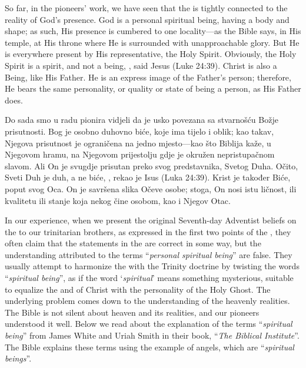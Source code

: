So far, in the pioneers’ work, we have seen that the  is tightly connected to the reality of God’s presence. God is a personal spiritual being, having a body and shape; as such, His presence is cumbered to one locality—as the Bible says, in His temple, at His throne where He is surrounded with unapproachable glory. But He is everywhere present by His representative, the Holy Spirit. Obviously, the Holy Spirit is a spirit, and not a being, , said Jesus (Luke 24:39). Christ is also a Being, like His Father. He is an express image of the Father’s person; therefore, He bears the same personality, or quality or state of being a person, as His Father does.


Do sada smo u radu pionira vidjeli da je  usko povezana sa stvarnošću Božje prisutnosti. Bog je osobno duhovno biće, koje ima tijelo i oblik; kao takav, Njegova prisutnost je ograničena na jedno mjesto—kao što Biblija kaže, u Njegovom hramu, na Njegovom prijestolju gdje je okružen nepristupačnom slavom. Ali On je svugdje prisutan preko svog predstavnika, Svetog Duha. Očito, Sveti Duh je duh, a ne biće, , rekao je Isus (Luka 24:39). Krist je također Biće, poput svog Oca. On je savršena slika Očeve osobe; stoga, On nosi istu ličnost, ili kvalitetu ili stanje koja nekog čine osobom, kao i Njegov Otac.


In our experience, when we present the original Seventh-day Adventist beliefs on the  to our trinitarian brothers, as expressed in the first two points of the , they often claim that the statements in the  are correct in some way, but the understanding attributed to the terms “\textit{personal spiritual being}” are false. They usually attempt to harmonize the  with the Trinity doctrine by twisting the words “\textit{spiritual being}”, as if the word ‘\textit{spiritual}’ means something mysterious, suitable to equalize the  and of Christ with the personality of the Holy Ghost. The underlying problem comes down to the understanding of the heavenly realities. The Bible is not silent about heaven and its realities, and our pioneers understood it well. Below we read about the explanation of the terms “\textit{spiritual being}” from James White and Uriah Smith in their book, “\textit{The Biblical Institute}”. The Bible explains these terms using the example of angels, which are “\textit{spiritual beings}”.


